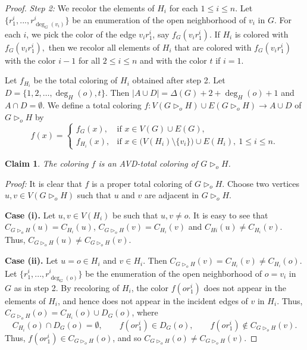 \documentclass[12pt]{article}
\theoremstyle{definition}
\newtheorem{claim}{Claim}
\begin{document}
\begin{proof}
{\em Step 2:} We recolor the elements of $H_i$ for each $1\leq i\leq n$.
Let $\{r_1^i,..., r_{\deg_G(v_i)}^i\}$ be an enumeration of the open neighborhood of $v_i$ in $G$.
For each $i$, we pick the color of the edge $v_ir_1^i$, say $f_G(v_ir_1^i)$.
\renewcommand{\thefootnote}{\fnsymbol{footnote}}
If $H_i$ is colored with $f_{G}(v_ir_1^i),$ then we recolor all elements of $H_i$ that are colored with $f_G(v_ir_1^i)$ with the color $i-1$ 
for all $2\leq i\leq n$
and with the color $t$ if $i=1$.\footnotemark
{}
\renewcommand{\thefootnote}{\arabic{footnote}}

Let $f_{H_i}$ be the total coloring of $H_i$ obtained after step 2.
Let
$D=\{1,2,\ldots,\deg_H(o),t\}$.
Then $|A\cup D|=\Delta(G)+2+\deg_H(o)+1$ and $A\cap D=\emptyset$.
We define a total coloring $f:V(G \triangleright_o H)\cup E(G \triangleright_o H)\rightarrow A\cup D$ of $G \triangleright_o H$ by
\[
f(x)=
\begin{cases}
f_G(x), & \text{if } x\in V(G)\cup E(G),\\
f_{H_i}(x), & \text{if } x\in \bigl(V(H_i)\setminus\{v_i\}\bigr)\cup E(H_i),\
1\le i\le n.
\end{cases}
\]

\begin{claim}\label{Claim 5}
{\em The coloring $f$ is an AVD-total coloring of $G \triangleright_o H$.}
\end{claim}

\textit{Proof:}
It is clear that $f$ is a proper total coloring of $G \triangleright_o H$.
Choose two vertices $u,v \in V(G \triangleright_o H)$ such that $u$ and $v$ are adjacent in $G \triangleright_o H$. 

\textbf{Case (i).} Let $u,v \in V(H_i)$ be such that $u,v \neq o$. 
It is easy to see that  $C_{G \triangleright_o H}(u)=C_{H_i}(u)$, $C_{G \triangleright_o H}(v)=C_{H_i}(v)$ and $C_{Hi}(u)\neq C_{H_i}(v)$. Thus, $C_{G \triangleright_o H}(u)\neq C_{G \triangleright_o H}(v)$. 

\textbf{Case (ii).} Let $u=o \in H_i$ and $v\in H_i$. Then $C_{G \triangleright_o H}(v)=C_{H_i}(v) \neq C_{H_i}(o)$.
Let $\{r_1^i,..., r_{\deg_G(o)}^i\}$ be the enumeration of the open neighborhood of $o=v_i$ in $G$ as in step 2.
By recoloring of $H_i$, the color $f(or_1^i)$ does not appear in the elements of $H_i$, and hence does not appear in the incident edges of $v$ in $H_i$.
Thus, $C_{G \triangleright_o H}(o)=C_{H_i}(o)\cup D_G(o)$, where
\[
C_{H_i}(o)\cap D_G(o)=\emptyset,\qquad
f(or_1^i)\in D_G(o),\qquad
f(or_1^i)\notin C_{G \triangleright_o H}(v).
\]
Thus, $f(or_1^i)\in C_{G \triangleright_o H}(o)$, and so $C_{G \triangleright_o H}(o)\neq C_{G \triangleright_o H}(v)$.


\end{proof}
\end{document}
